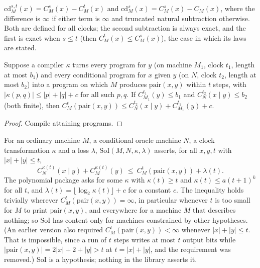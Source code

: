 \begin{definition}
  \label{def:avg-depth}
  \leanok
  $\mathrm{cd}^{s,t}_M(x) = C^s_M(x) - C^t_M(x)$ and
  $\mathrm{cd}^{s}_M(x) = C^s_M(x) - C_M(x)$, where the difference is $\infty$
  if either term is $\infty$ and truncated natural subtraction otherwise. Both
  are defined for all clocks; the second subtraction is always exact, and the
  first is exact when $s \le t$ (then $C^t_M(x) \le C^s_M(x)$), the case in
  which its laws are stated.
\end{definition}

\begin{theorem}
  \label{thm:avg-upper-chain}
  \leanok
  Suppose a compiler $\kappa$ turns every program for $y$ (on machine $M_1$,
  clock $t_1$, length at most $b_1$) and every conditional program for $x$
  given $y$ (on $N$, clock $t_2$, length at most $b_2$) into a program on which
  $M$ produces $\mathrm{pair}(x, y)$ within $t$ steps, with $|\kappa(p, q)| \le
  |p| + |q| + c$ for all such $p, q$. If $C^{t_1}_{M_1}(y) \le b_1$ and
  $C^{t_2}_N(x \mid y) \le b_2$ (both finite), then
  $C^t_M(\mathrm{pair}(x,y)) \le C^{t_2}_N(x \mid y) + C^{t_1}_{M_1}(y) + c$.
\end{theorem}
\begin{proof}
  \leanok
  Compile attaining programs.
\end{proof}

\begin{definition}
  \label{def:avg-soi}
  \leanok
  For an ordinary machine $M$, a conditional oracle machine $N$, a clock
  transformation $\kappa$ and a loss $\lambda$, $\mathrm{SoI}(M, N, \kappa,
  \lambda)$ asserts, for all $x, y, t$ with $|x| + |y| \le t$,
  \[
    C^{\kappa(t)}_N(x \mid y) + C^{\kappa(t)}_M(y) \ \le\
    C^t_M(\mathrm{pair}(x,y)) + \lambda(t).
  \]
  The polynomial package asks for some $\kappa$ with $\kappa(t) \ge t$ and
  $\kappa(t) \le a(t+1)^k$ for all $t$, and $\lambda(t) = \lfloor \log_2
  \kappa(t) \rfloor + c$ for a constant $c$. The inequality holds trivially
  wherever $C^t_M(\mathrm{pair}(x,y)) = \infty$, in particular whenever $t$ is
  too small for $M$ to print $\mathrm{pair}(x,y)$, and everywhere for a machine
  $M$ that describes nothing; so SoI has content only for machines constrained
  by other hypotheses. (An earlier version also required
  $C^t_M(\mathrm{pair}(x,y)) < \infty$ whenever $|x| + |y| \le t$. That is
  impossible, since a run of $t$ steps writes at most $t$ output bits while
  $|\mathrm{pair}(x,y)| = 2|x| + 2 + |y| > t$ at $t = |x| + |y|$, and the
  requirement was removed.) SoI is a hypothesis; nothing in the library
  asserts it.
\end{definition}

